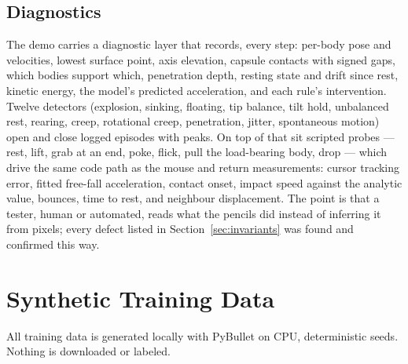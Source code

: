 \documentclass[11pt]{article}
\begin{document}
\subsection{Diagnostics}
\label{sec:diagnostics}
The demo carries a diagnostic layer that records, every step: per-body pose and velocities, lowest surface point, axis elevation, capsule contacts with signed gaps, which bodies support which, penetration depth, resting state and drift since rest, kinetic energy, the model's predicted acceleration, and each rule's intervention. Twelve detectors (explosion, sinking, floating, tip balance, tilt hold, unbalanced rest, rearing, creep, rotational creep, penetration, jitter, spontaneous motion) open and close logged episodes with peaks. On top of that sit scripted probes --- rest, lift, grab at an end, poke, flick, pull the load-bearing body, drop --- which drive the same code path as the mouse and return measurements: cursor tracking error, fitted free-fall acceleration, contact onset, impact speed against the analytic value, bounces, time to rest, and neighbour displacement. The point is that a tester, human or automated, reads what the pencils did instead of inferring it from pixels; every defect listed in Section~\ref{sec:invariants} was found and confirmed this way.

\section{Synthetic Training Data}
\label{sec:data}

All training data is generated locally with PyBullet on CPU, deterministic seeds. Nothing is downloaded or labeled.
\end{document}
